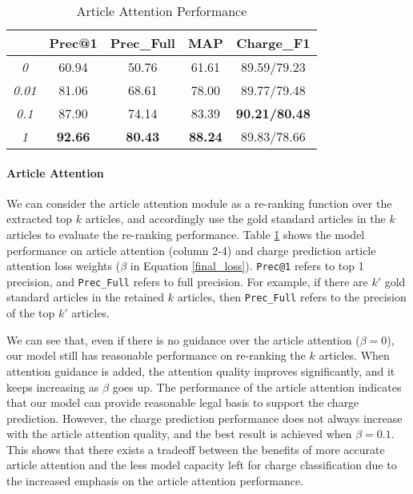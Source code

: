 \begin{table}
\centering
\normalsize{
\begin{tabular}{|c|c|c|c|c|}
\hline
\bm{$\beta$}			& \textbf{Prec@1} 			& \textbf{Prec\_Full} 			& \textbf{MAP} 			& \textbf{Charge\_F1} \\
\hline
\textit{0} 								& 60.94									& 50.76  									& 61.61 						& 89.59/79.23 	\\
\hline
\textit{0.01} 						& 81.06									& 68.61  									& 78.00							& 89.77/79.48 	\\
\hline
\textit{0.1} 							& 87.90									& 74.14  									& 83.39							& \textbf{90.21/80.48} 	\\
\hline
\textit{1} 								& \textbf{92.66}				& \textbf{80.43}  				& \textbf{88.24}		& 89.83/78.66 	\\
\hline
\end{tabular}
}
\caption{Article Attention Performance}
\label{tab_article_att}
\end{table}


\paragraph{Article Attention}
We can consider the article attention module as a re-ranking function over the extracted top $k$ articles, and accordingly use the gold standard articles in the $k$ articles to evaluate the re-ranking performance. Table \ref{tab_article_att} shows the model performance on article attention (column 2-4) and charge prediction  article attention loss weights ($\beta$ in Equation \ref{final_loss}). \texttt{Prec@1} refers to top 1 precision, and \texttt{Prec\_Full} refers to full precision. For example, if there are $k'$ gold standard articles in the retained $k$ articles, then \texttt{Prec\_Full} refers to the precision of the top $k'$ articles.

We can see that, even if there is no guidance over the article attention ($\beta=0$), our model still has reasonable performance on re-ranking the $k$ articles. When attention guidance is added, the attention quality improves significantly, and it keeps increasing as $\beta$ goes up.
The  performance of the article attention indicates that our model can provide reasonable legal basis to support the charge prediction.
However, the charge prediction performance does not always increase with the article attention quality, and the best result is achieved when $\beta=0.1$. This shows that there exists a tradeoff between the benefits of more accurate article attention and the less model capacity left for charge classification due to the increased emphasis on the article attention performance.


